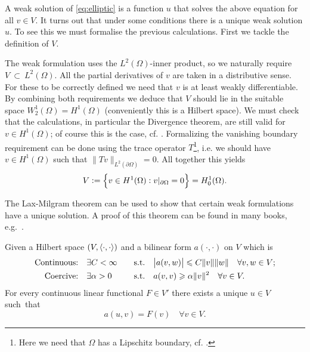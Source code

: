 \documentclass[thesis.tex]{subfiles}
\begin{document}
A weak solution of \eqref{eq:elliptic} is a function $u$ that solves the above equation for all $v \in V$.
It turns out that under some conditions there is a unique weak solution $u$. To see this
we must formalise the previous calculations. First we tackle the definition of $V$.

The weak formulation uses the $L^2(\Omega)$-inner product, so we naturally require~$V~\subset~L^2(\Omega)$.
All the partial derivatives of $v$ are taken in a distributive sense.
For these to be correctly defined we need that $v$ is at least weakly differentiable.
By combining both requirements we deduce that $V$ should lie in the suitable space 
$W_2^1(\Omega) = H^1(\Omega)$ (conveniently this is a Hilbert space).
We must check that the calculations, in particular the Divergence theorem, are still valid for $v \in H^1(\Omega)$;
of course this is the case, cf. \cite[Ch. 5]{brenner}.
Formalizing the vanishing boundary requirement can be done using the trace operator $T$\footnote{Here we need that $\Omega$ has a Lipschitz boundary, cf. \cite[Ch. 1.6]{brenner}.},
i.e. we should have $v \in H^1(\Omega)$ such that $\|Tv\|_{L^2(\partial \Omega)} = 0$. All together this yields
\[
  V := \set{v \in H^1(\Omega): v|_{\partial \Omega} = 0} = H_0^1(\Omega).
\]

The Lax-Milgram theorem can be used to show that certain weak formulations have a unique solution.
A proof of this theorem can be found in many books, e.g.~\cite[\S2]{brenner}.
\begin{thm}
  \label{thm:lax}
  Given a Hilbert space $(V, \langle \cdot, \cdot \rangle)$ and a bilinear form $a(\cdot,\cdot)$ on $V$ which is
  \begin{alignat*}{3}
    \text{Continuous:} \quad & \exists C < \infty \quad & \text{s.t.} \quad & \abs{a(v,w)} \leqslant C \|v\|\|w\| \quad \forall v,w \in V; \\
    \text{Coercive:}   \quad & \exists \alpha > 0 \quad &\text{s.t.} \quad & a(v,v) \geqslant \alpha \|v\|^2 \quad \forall v \in V.
  \end{alignat*}
  For every continuous linear functional $F \in V'$ there exists a unique $u \in V$ such~that
  \[
    a(u,v) = F(v) \quad \forall v\in V.
  \]
\end{thm}
\end{document}
